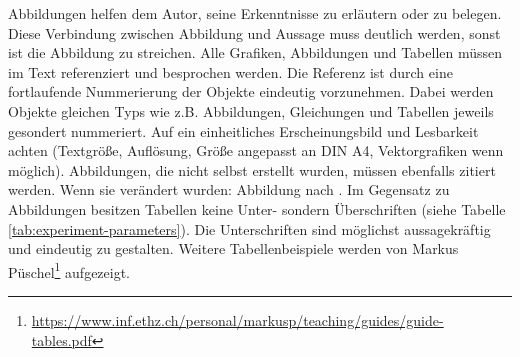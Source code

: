 Abbildungen helfen dem Autor, seine Erkenntnisse zu erläutern oder zu belegen. Diese Verbindung zwischen Abbildung und Aussage muss deutlich werden, sonst ist die Abbildung zu streichen. Alle Grafiken, Abbildungen und Tabellen müssen im Text referenziert und besprochen werden. Die Referenz ist durch eine fortlaufende Nummerierung der Objekte eindeutig vorzunehmen. Dabei werden Objekte gleichen Typs wie z.B. Abbildungen, Gleichungen und Tabellen jeweils gesondert nummeriert. Auf ein einheitliches Erscheinungsbild und Lesbarkeit achten (Textgröße, Auflösung, Größe angepasst an DIN A4, Vektorgrafiken wenn möglich). Abbildungen, die nicht selbst erstellt wurden, müssen ebenfalls zitiert werden. Wenn sie verändert wurden: \glqq Abbildung nach \cite{schoof2014}\grqq. Im Gegensatz zu Abbildungen besitzen Tabellen keine Unter- sondern Überschriften (siehe Tabelle \ref{tab:experiment-parameters}). Die Unterschriften sind möglichst aussagekräftig und eindeutig zu gestalten. Weitere Tabellenbeispiele werden von Markus Püschel\footnote{\url{https://www.inf.ethz.ch/personal/markusp/teaching/guides/guide-tables.pdf}} aufgezeigt. 


